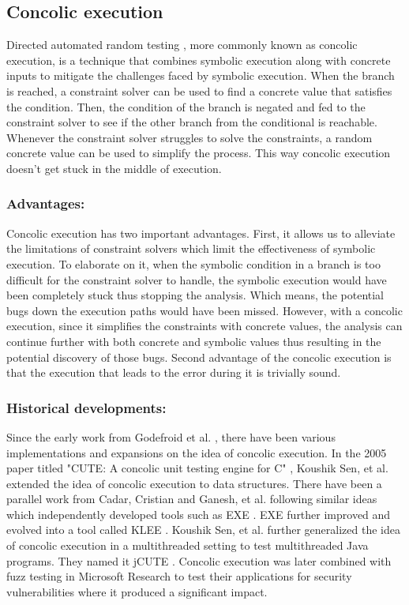 \documentclass[ runningheads,
               a4paper]{llncs}
\begin{document}
\subsection{Concolic execution}
Directed automated random testing \cite[DART]{godefroid2005dart}, more commonly known as concolic execution, is a technique that combines symbolic execution along with concrete inputs to mitigate the challenges faced by symbolic execution. When the branch is reached, a constraint solver can be used to find a concrete value that satisfies the condition. Then, the condition of the branch is negated and fed to the constraint solver to see if the other branch from the conditional is reachable. Whenever the constraint solver struggles to solve the constraints, a random concrete value can be used to simplify the process. This way concolic execution doesn't get stuck in the middle of execution.


\subsubsection{Advantages:}
Concolic execution has two important advantages. First, it allows us to alleviate the limitations of constraint solvers which limit the effectiveness of symbolic execution. To elaborate on it, when the symbolic condition in a branch is too difficult for the constraint solver to handle, the symbolic execution would have been completely stuck thus stopping the analysis. Which means, the potential bugs down the execution paths would have been missed. However, with a concolic execution, since it simplifies the constraints with concrete values, the analysis can continue further with both concrete and symbolic values thus resulting in the potential discovery of those bugs. Second advantage of the concolic execution is that the execution that leads to the error during it is trivially sound.


\subsubsection{Historical developments:}
Since the early work from Godefroid et al. \cite{godefroid2005dart}, there have been various implementations and expansions on the idea of concolic execution. In the 2005 paper titled "CUTE: A concolic unit testing engine for C" \cite{sen2005cute}, Koushik Sen, et al. extended the idea of concolic execution to data structures. There have been a parallel work from Cadar, Cristian and Ganesh, et al. following similar ideas which independently developed tools such as EXE \cite{cadar2008exe}. EXE further improved and evolved into a tool called KLEE \cite{cadar2008klee}.  Koushik Sen, et al. further generalized the idea of concolic execution in a multithreaded setting to test multithreaded Java programs. They named it jCUTE \cite{sen2006cute}. Concolic execution was later combined with fuzz testing in Microsoft Research \cite[SAGE]{godefroid2012sage} to test their applications for security vulnerabilities where it produced a significant impact.
\end{document}
